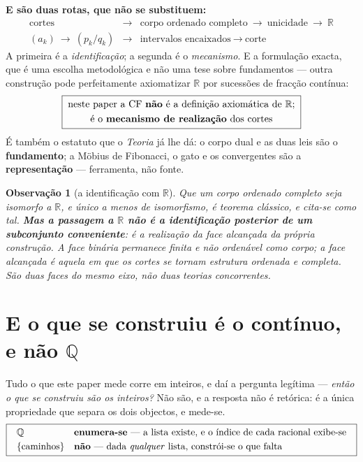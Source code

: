 \documentclass[11pt,a4paper]{article}
\newtheorem{observacao}{Observação}
\begin{document}
\noindent\textbf{E são duas rotas, que não se substituem:}
\[
\boxed{
\begin{array}{lcl}
\text{cortes} &\longrightarrow& \text{corpo ordenado completo}
\ \longrightarrow\ \text{unicidade}\ \longrightarrow\ \mathbb{R}\\[4pt]
(a_k) \ \longrightarrow\ (p_k/q_k) &\longrightarrow&
\text{intervalos encaixados}\ \longrightarrow\ \text{corte}
\end{array}}
\]
A primeira é a \emph{identificação}; a segunda é o \emph{mecanismo}. E a
formulação exacta, que é uma escolha metodológica e não uma tese sobre
fundamentos --- outra construção pode perfeitamente axiomatizar $\mathbb{R}$ por
sucessões de fracção contínua:
\[
\boxed{\;\begin{gathered}
\text{neste paper a CF \textbf{não} é a definição axiomática de }\mathbb{R};\\
\text{é o \textbf{mecanismo de realização} dos cortes}
\end{gathered}\;}
\]
É também o estatuto que o \emph{Teoria} já lhe dá: o corpo dual e as duas leis são
o \textbf{fundamento}; a Möbius de Fibonacci, o gato e os convergentes são a
\textbf{representação} --- ferramenta, não fonte.

\begin{observacao}[a identificação com $\mathbb{R}$]
Que um corpo ordenado completo seja isomorfo a $\mathbb{R}$, e único a menos de
isomorfismo, é teorema clássico, e cita-se como tal. \textbf{Mas a passagem a
$\mathbb{R}$ não é a identificação posterior de um subconjunto conveniente}: é
a realização da \emph{face alcançada} da própria construção. A face binária
permanece finita e não ordenável como corpo; a face alcançada é aquela em que
os cortes se tornam estrutura ordenada e completa. \emph{São duas faces do
mesmo eixo, não duas teorias concorrentes.}
\end{observacao}

\section{E o que se construiu é o contínuo, e não $\mathbb{Q}$}\label{sec:continuo}

\noindent Tudo o que este paper mede corre em inteiros, e daí a pergunta legítima
--- \emph{então o que se construiu são os inteiros?} Não são, e a resposta não é
retórica: é a única propriedade que separa os dois objectos, e mede-se.
\[
\boxed{\;\begin{array}{ll}
\mathbb{Q} & \textbf{enumera-se} \text{ --- a lista existe, e o índice de cada
racional exibe-se}\\[3pt]
\{\text{caminhos}\} & \textbf{não} \text{ --- dada \emph{qualquer} lista,
constrói-se o que falta}
\end{array}\;}
\]
\end{document}
